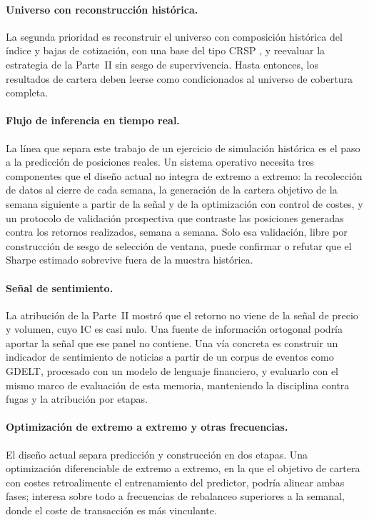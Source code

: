 \paragraph{Universo con reconstrucción histórica.} La segunda prioridad es reconstruir el
universo con composición histórica del índice y bajas de cotización, con una base del tipo
CRSP \autocite{crsp2025stock}, y reevaluar la estrategia de la Parte~II sin sesgo de
supervivencia. Hasta entonces, los resultados de cartera deben leerse como condicionados
al universo de cobertura completa.

\paragraph{Flujo de inferencia en tiempo real.} La línea que separa este trabajo de un
ejercicio de simulación histórica es el paso a la predicción de posiciones reales. Un
sistema operativo necesita tres componentes que el diseño actual no integra de extremo a
extremo: la recolección de datos al cierre de cada semana, la generación de la cartera
objetivo de la semana siguiente a partir de la señal y de la optimización con control de
costes, y un protocolo de validación prospectiva que contraste las posiciones generadas
contra los retornos realizados, semana a semana. Solo esa validación, libre por
construcción de sesgo de selección de ventana, puede confirmar o refutar que el Sharpe
estimado sobrevive fuera de la muestra histórica.

\paragraph{Señal de sentimiento.} La atribución de la Parte~II mostró que el retorno no
viene de la señal de precio y volumen, cuyo IC es casi nulo. Una fuente de información
ortogonal podría aportar la señal que ese panel no contiene. Una vía concreta es construir
un indicador de sentimiento de noticias a partir de un corpus de eventos como GDELT,
procesado con un modelo de lenguaje financiero, y evaluarlo con el mismo marco de
evaluación de esta memoria, manteniendo la disciplina contra fugas y la atribución por
etapas.

\paragraph{Optimización de extremo a extremo y otras frecuencias.} El diseño actual separa
predicción y construcción en dos etapas. Una optimización diferenciable de extremo a
extremo, en la que el objetivo de cartera con costes retroalimente el entrenamiento del
predictor, podría alinear ambas fases; interesa sobre todo a frecuencias de rebalanceo
superiores a la semanal, donde el coste de transacción es más vinculante.

